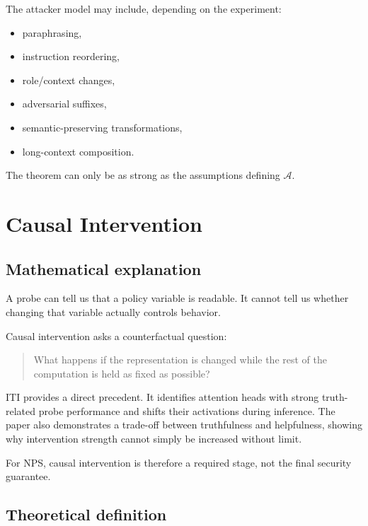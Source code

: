 \documentclass[11pt]{article}
\newcommand{\A}{\mathcal{A}}
\begin{document}
The attacker model may include, depending on the experiment:

\begin{itemize}
    \item paraphrasing,
    \item instruction reordering,
    \item role/context changes,
    \item adversarial suffixes,
    \item semantic-preserving transformations,
    \item long-context composition.
\end{itemize}

The theorem can only be as strong as the assumptions defining $\A$.

\section{Causal Intervention}

\subsection*{Mathematical explanation}

A probe can tell us that a policy variable is readable. It cannot tell us
whether changing that variable actually controls behavior.

Causal intervention asks a counterfactual question:

\begin{quote}
What happens if the representation is changed while the rest of the
computation is held as fixed as possible?
\end{quote}

ITI provides a direct precedent. It identifies attention heads with strong
truth-related probe performance and shifts their activations during inference.
The paper also demonstrates a trade-off between truthfulness and helpfulness,
showing why intervention strength cannot simply be increased without limit.

For NPS, causal intervention is therefore a required stage, not the final
security guarantee.

\subsection*{Theoretical definition}
\end{document}

